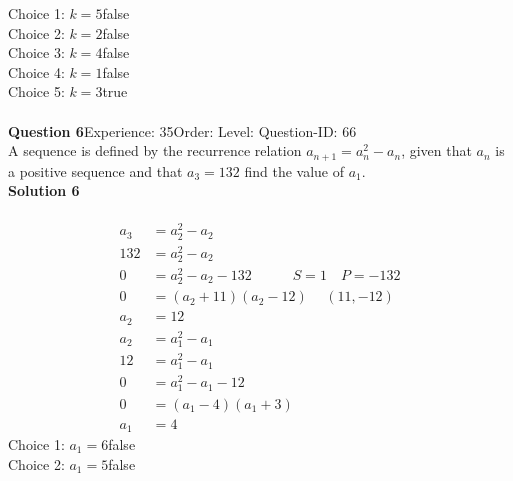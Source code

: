 \documentclass{article}
\begin{document}
Choice 1: \hspace{20pt}$k=5$\hspace{20pt}false\\
Choice 2: \hspace{20pt}$k=2$\hspace{20pt}false\\
Choice 3: \hspace{20pt}$k=4$\hspace{20pt}false\\
Choice 4: \hspace{20pt}$k=1$\hspace{20pt}false\\
Choice 5: \hspace{20pt}$k=3$\hspace{20pt}true\\
\\[4pt]
\noindent\textbf{Question 6}\hspace{20pt}Experience: 35\hspace{20pt}Order: \hspace{20pt}Level: \hspace{20pt}Question-ID: 66\\[2pt]
A sequence is defined by the recurrence relation $a_{n+1}=a_n^2-a_n$, given that $a_n$ is a positive sequence and that $a_3=132$ find the value of $a_1$.\\[4pt]
\noindent\textbf{Solution 6}\\[2pt]
\\[-35pt]\begin{align*}
a_3&=a_2^2-a_2\\[2pt]
132&=a_2^2-a_2\\[2pt]
0&=a_2^2-a_2-132 \hspace{35pt} S=1 \quad P=-132\\[2pt]
0&=(a_2+11)(a_2-12)\hspace{15pt} (11,-12)\\[2pt]
a_2&=12\\[12pt]
a_2&=a_1^2-a_1\\[2pt]
12&=a_1^2-a_1\\[2pt]
0&=a_1^2-a_1-12\\[2pt]
0&=(a_1-4)(a_1+3)\\[2pt]
a_1&=4
\end{align*}
Choice 1: \hspace{20pt}$a_1=6$\hspace{20pt}false\\
Choice 2: \hspace{20pt}$a_1=5$\hspace{20pt}false\\
\end{document}
